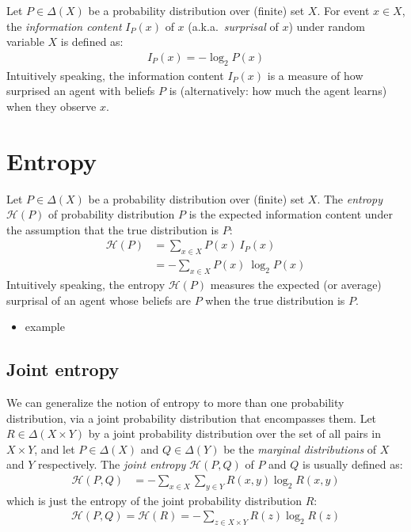 \documentclass[nobib,nofonts]{tufte-handout}
\begin{document}
Let $P\in \Delta(X)$ be a probability distribution over (finite) set $X$.
For event $x \in X$, the \emph{information content} $I_{P}(x)$ of $x$ (a.k.a.~\emph{surprisal} of $x$) under random variable $X$ is defined as:
\begin{align*}
  I_{P}(x) = - \log_{2} P(x)
\end{align*}
Intuitively speaking, the information content $I_{P}(x)$ is a measure of how surprised an agent with beliefs $P$ is (alternatively: how much the agent learns) when they observe $x$.

\section{Entropy}

Let $P\in \Delta(X)$ be a probability distribution over (finite) set $X$.
The \emph{entropy} $\mathcal{H}(P)$ of probability distribution $P$ is the expected information content under the assumption that the true distribution is $P$:
\begin{align*}
  \mathcal{H}(P) & = \sum_{x \in X} P(x) \ I_{P}(x) \\
                 & = - \sum_{x \in X} P(x) \ \log_{2} P(x)
\end{align*}
Intuitively speaking, the entropy $\mathcal{H}(P)$ measures the expected (or average) surprisal of an agent whose beliefs are $P$ when the true distribution is $P$.

\begin{itemize}
  \item example
\end{itemize}

\subsection{Joint entropy}

We can generalize the notion of entropy to more than one probability distribution, via a joint probability distribution that encompasses them.
Let $R \in \Delta(X \times Y)$ by a joint probability distribution over the set of all pairs in $X \times Y$, and let $P \in \Delta(X)$ and $Q \in \Delta(Y)$ be the \emph{marginal distributions} of $X$ and $Y$ respectively.
The \emph{joint entropy} $\mathcal{H}(P,Q)$ of $P$ and $Q$ is usually defined as:
\begin{align*}
  \mathcal{H}(P, Q) & = - \sum_{x \in X} \sum_{y\in Y} R(x,y) \log_{2} R(x,y)
\end{align*}
which is just the entropy of the joint probability distribution $R$:
\begin{align*}
  \mathcal{H}(P, Q) = \mathcal{H}(R) = - \sum_{z \in X \times Y} R(z) \log_{2} R(z)
\end{align*}
\end{document}
